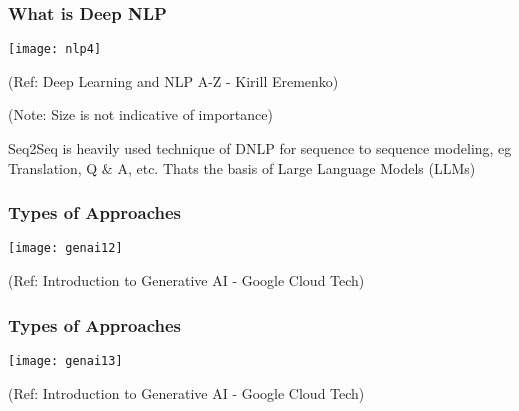 \begin{frame}[fragile]\frametitle{What is Deep NLP}
\begin{center}
\texttt{[image: nlp4]}

\tiny{(Ref: Deep Learning and NLP A-Z - Kirill Eremenko)}

\tiny{(Note: Size is not indicative of importance)}
\end{center}

Seq2Seq is heavily used technique of DNLP for sequence to sequence modeling, eg Translation, Q \& A, etc. Thats the basis of Large Language Models (LLMs)

	

\end{frame}

\begin{frame}[fragile]\frametitle{Types of Approaches}

\begin{center}
\texttt{[image: genai12]}
\end{center}

{\tiny (Ref: Introduction to Generative AI - Google Cloud Tech)}

\end{frame}

\begin{frame}[fragile]\frametitle{Types of Approaches}

\begin{center}
\texttt{[image: genai13]}
\end{center}


{\tiny (Ref: Introduction to Generative AI - Google Cloud Tech)}

\end{frame}

